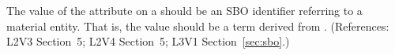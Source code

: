 The value of the  attribute on a \Compartment should be an SBO
identifier referring to a material entity.  That is, the value
should be a term derived from \sbomaterialentity.  (References: 
L2V3 Section~5; L2V4 Section~5; L3V1 Section~\ref{sec:sbo}.)
